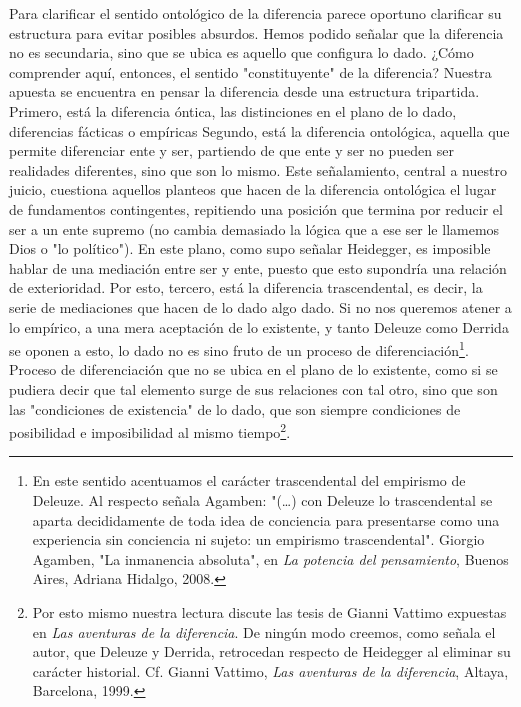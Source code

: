 \documentclass{book}
\begin{document}
Para clarificar el sentido ontológico de la diferencia parece oportuno
clarificar su estructura para evitar posibles absurdos. Hemos podido
señalar que la diferencia no es secundaria, sino que se ubica es aquello
que configura lo dado. ¿Cómo comprender aquí, entonces, el sentido
"constituyente" de la diferencia? Nuestra apuesta se encuentra en pensar
la diferencia desde una estructura tripartida. Primero, está la
diferencia óntica, las distinciones en el plano de lo dado, diferencias
fácticas o empíricas Segundo, está la diferencia ontológica, aquella que
permite diferenciar ente y ser, partiendo de que ente y ser no pueden
ser realidades diferentes, sino que son lo mismo. Este señalamiento,
central a nuestro juicio, cuestiona aquellos planteos que hacen de la
diferencia ontológica el lugar de fundamentos contingentes, repitiendo
una posición que termina por reducir el ser a un ente supremo (no cambia
demasiado la lógica que a ese ser le llamemos Dios o "lo político"). En
este plano, como supo señalar Heidegger, es imposible hablar de una
mediación entre ser y ente, puesto que esto supondría una relación de
exterioridad. Por esto, tercero, está la diferencia trascendental, es
decir, la serie de mediaciones que hacen de lo dado algo dado. Si no nos
queremos atener a lo empírico, a una mera aceptación de lo existente, y
tanto Deleuze como Derrida se oponen a esto, lo dado no es sino fruto de
un proceso de diferenciación\footnote{En este sentido acentuamos el
  carácter trascendental del empirismo de Deleuze. Al respecto señala
  Agamben: "(\dots) con Deleuze lo trascendental se aparta
  decididamente de toda idea de conciencia para presentarse como una
  experiencia sin conciencia ni sujeto: un empirismo trascendental".
  Giorgio Agamben, "La inmanencia absoluta", en \emph{La potencia del
  pensamiento}, Buenos Aires, Adriana Hidalgo, 2008.}. Proceso de
diferenciación que no se ubica en el plano de lo existente, como si se
pudiera decir que tal elemento surge de sus relaciones con tal otro,
sino que son las "condiciones de existencia" de lo dado, que son siempre
condiciones de posibilidad e imposibilidad al mismo tiempo\footnote{Por
  esto mismo nuestra lectura discute las tesis de Gianni Vattimo
  expuestas en \emph{Las aventuras de la diferencia}. De ningún modo
  creemos, como señala el autor, que Deleuze y Derrida, retrocedan
  respecto de Heidegger al eliminar su carácter historial. Cf. Gianni
  Vattimo, \emph{Las aventuras de la diferencia}, Altaya, Barcelona,
  1999.}.
\end{document}
